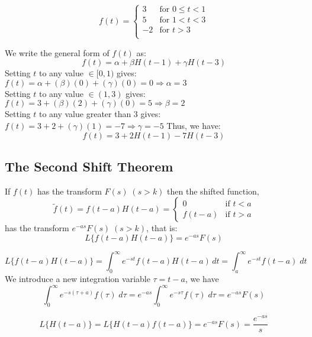 \documentclass[a4paper, 10pt]{article}
\begin{document}
\begin{examplebox}
  $$f(t) = \begin{cases}
    3 & \text{for } 0 \leq t < 1 \\
    5 & \text{for } 1 < t < 3 \\
    -2 & \text{for } t > 3 \\
  \end{cases}$$

  We write the general form of $f(t)$ as:
  $$f(t) = \alpha + \beta H(t-1) + \gamma H(t-3)$$
  Setting $t$ to any value $\in [0,1)$ gives: $f(t) = \alpha + (\beta)(0) + (\gamma)(0) = 0 \Rightarrow \alpha = 3$ \\
  Setting $t$ to any value $\in (1,3)$ gives: $f(t) = 3 + (\beta)(2) + (\gamma)(0) = 5 \Rightarrow \beta = 2$ \\
  Setting $t$ to any value greater than 3 gives: $f(t) = 3 + 2 + (\gamma)(1) = -7 \Rightarrow \gamma = -5$
  Thus, we have:
  $$f(t) = 3 + 2H(t-1) - 7H(t-3)$$
\end{examplebox}

\pagebreak

\subsection{The Second Shift Theorem}
\begin{theorembox}
  If $f(t)$ has the transform $F(s) \; (s > k)$ then the shifted function, 
  $$
  \tilde{f}(t) = f(t-a)H(t-a) = \begin{cases}
    0 & \text{if } t < a \\
    f(t-a) & \text{if } t > a
  \end{cases}
  $$
  has the transform $e^{-as}F(s)\; (s > k)$, that is:
  $$L\{f(t-a)H(t-a)\} = e^{-as}F(s)$$
\end{theorembox}

\begin{proofbox}
  $$L\{f(t-a)H(t-a)\} = \int_0^\infty e^{-st}f(t-a)H(t-a)\, dt = \int_a^\infty e^{-st}f(t-a)\;dt$$
  We introduce a new integration variable $\tau = t-a$, we have
  $$\int_0^\infty e^{-s(\tau + a)}f(\tau)\;d\tau = e^{-as}\int_0^\infty e^{-s\tau}f(\tau)\;d\tau = e^{-as}F(s)$$
\end{proofbox}

\begin{examplebox}
  $$L\{H(t-a)\} = L\{H(t-a)f(t-a)\} = e^{-as}F(s) = \dfrac{e^{-as}}{s}$$
\end{examplebox}
\end{document}
